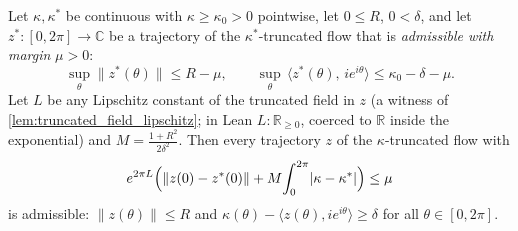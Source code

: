 \begin{lemma}

  \label{lem:invariant_admissible_domain}
  Let $\kappa,\kappa^\ast$ be continuous with $\kappa\ge\kappa_0>0$ pointwise, let
  $0\le R$, $0<\delta$, and let $z^\ast:[0,2\pi]\to\mathbb C$ be a trajectory of the
  $\kappa^\ast$-truncated flow that is \emph{admissible with margin} $\mu>0$:
  \[
    \sup_\theta\|z^\ast(\theta)\|\le R-\mu,
    \qquad
    \sup_\theta\,\langle z^\ast(\theta),\,i e^{i\theta}\rangle\le\kappa_0-\delta-\mu .
  \]
  Let $L$ be any Lipschitz constant of the truncated field in $z$ (a witness of
  \cref{lem:truncated_field_lipschitz}; in Lean $L:\mathbb R_{\ge0}$, coerced to
  $\mathbb R$ inside the exponential) and
  $M=\tfrac{1+R^2}{2\delta^2}$. Then every trajectory $z$ of the $\kappa$-truncated flow
  with
  \[
    e^{2\pi L}\Bigl(\|z(0)-z^\ast(0)\|+M\!\int_0^{2\pi}\!|\kappa-\kappa^\ast|\Bigr)\le\mu
  \]
  is admissible: $\|z(\theta)\|\le R$ and
  $\kappa(\theta)-\langle z(\theta),i e^{i\theta}\rangle\ge\delta$ for all
  $\theta\in[0,2\pi]$.
\end{lemma}

